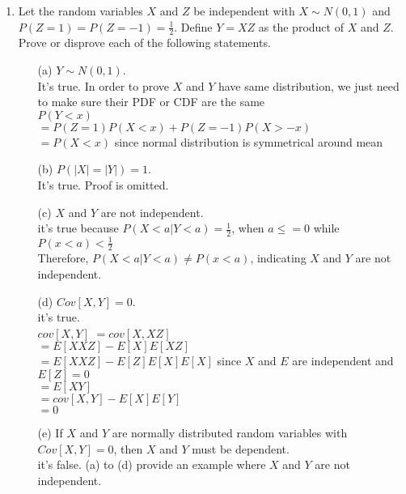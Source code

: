 \documentclass[letterpaper,12pt]{article}
\theoremstyle{definition}
\begin{document}
\begin{enumerate}
	\item Let the random variables $X$ and $Z$ be independent with $X \sim N(0,1)$ and $P(Z=1)=P(Z=-1)=\frac{1}{2}$. 			Define $Y= XZ$ as the product of $X$ and $Z$. Prove or disprove each of the following statements.
		\begin{itemize}
			\item[(a)] $Y \sim N(0,1)$.\\
			It's true. In order to prove $X$ and $Y$ have same distribution, we just need to make sure their PDF or CDF are the same\\
			$P(Y < x)$\\
			$= P(Z = 1)P(X < x) + P(Z = -1)P(X > -x)$\\
			$= P(X<x)$ since normal distribution is symmetrical around mean\\

			\item[(b)] $P(|X|=|Y|)=1$.\\
			It's true. Proof is omitted.\\

			\item[(c)] $X$ and $Y$ are not independent.\\
			it's true because $P(X < a| Y < a)  = \frac{1}{2}$, when $a \leq = 0$ while $P(x < a) < \frac{1}{2}$\\
			Therefore, $P(X < a| Y < a) \neq P(x < a)$, indicating $X$ and $Y$ are not independent.\\
			\item[(d)] $Cov[X,Y]=0$.\\
			it's true.\\
			$cov[X, Y]$
			$= cov[X, XZ]$\\
			$= E[XXZ] - E[X]E[XZ]$\\
			$= E[XXZ] - E[Z]E[X]E[X]$ since $X$ and $E$ are independent and $E[Z] = 0$\\
			$= E[XY]$\\
			$= cov[X, Y] - E[X]E[Y]$\\
			$= 0$\\

			\item[(e)] If $X$ and $Y$ are normally distributed random variables with $Cov[X,Y]=0$, then $X$ and $Y$ 					must be dependent.\\
			it's false. (a) to (d) provide an example where $X$ and $Y$ are not independent.\\

		\end{itemize}


\end{enumerate}
\end{document}
